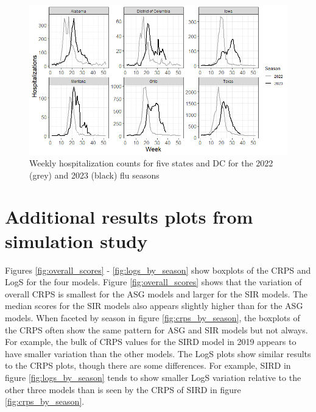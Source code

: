 \documentclass[ba]{imsart}
\theoremstyle{plain}
\theoremstyle{definition}
\theoremstyle{remark}
\begin{document}
\begin{supplement}
\begin{figure}[hbt!]
    \centering
    \includegraphics[scale=.65]{Images/hosp_vs_week.png}
    \caption{Weekly hospitalization counts for five states and DC for the 2022 (grey) and 2023 (black) flu seasons}
    \label{fig:hosp_vs_week}
\end{figure}





% 




\section{Additional results plots from simulation study}


Figures \ref{fig:overall_scores} - \ref{fig:logs_by_season} show boxplots of the CRPS and LogS for the four models. Figure \ref{fig:overall_scores} shows that the variation of overall CRPS is smallest for the ASG models and larger for the SIR models. The median scores for the SIR models also appears slightly higher than for the ASG models. 
When faceted by season in figure \ref{fig:crps_by_season}, the boxplots of the CRPS often show the same pattern for ASG and SIR models but not always. For example, the bulk of CRPS values for the SIRD model in 2019 appears to have smaller variation than the other models.
The LogS plots show similar results to the CRPS plots, though there are some differences. For example, SIRD in figure \ref{fig:logs_by_season} tends to show smaller LogS variation relative to the other three models than is seen by the CRPS of SIRD in figure \ref{fig:crps_by_season}.


\end{supplement}
\end{document}
